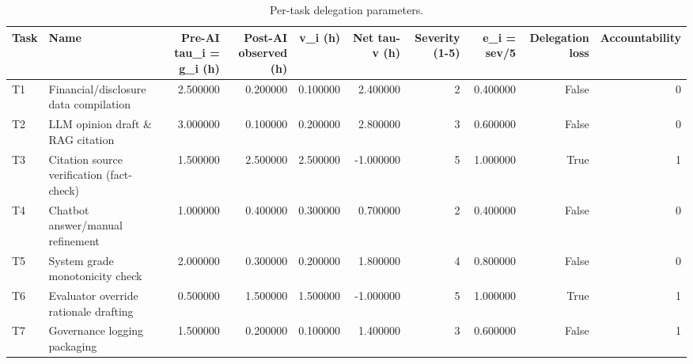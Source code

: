 \begin{table}
\caption{Per-task delegation parameters.}
\label{tab:task}
\begin{tabular}{llrrrrrrrr}
\toprule
Task & Name & Pre-AI tau\_i = g\_i (h) & Post-AI observed (h) & v\_i (h) & Net tau-v (h) & Severity (1-5) & e\_i = sev/5 & Delegation loss & Accountability \\
\midrule
T1 & Financial/disclosure data compilation & 2.500000 & 0.200000 & 0.100000 & 2.400000 & 2 & 0.400000 & False & 0 \\
T2 & LLM opinion draft \& RAG citation & 3.000000 & 0.100000 & 0.200000 & 2.800000 & 3 & 0.600000 & False & 0 \\
T3 & Citation source verification (fact-check) & 1.500000 & 2.500000 & 2.500000 & -1.000000 & 5 & 1.000000 & True & 1 \\
T4 & Chatbot answer/manual refinement & 1.000000 & 0.400000 & 0.300000 & 0.700000 & 2 & 0.400000 & False & 0 \\
T5 & System grade monotonicity check & 2.000000 & 0.300000 & 0.200000 & 1.800000 & 4 & 0.800000 & False & 0 \\
T6 & Evaluator override rationale drafting & 0.500000 & 1.500000 & 1.500000 & -1.000000 & 5 & 1.000000 & True & 1 \\
T7 & Governance logging packaging & 1.500000 & 0.200000 & 0.100000 & 1.400000 & 3 & 0.600000 & False & 1 \\
\bottomrule
\end{tabular}
\end{table}
